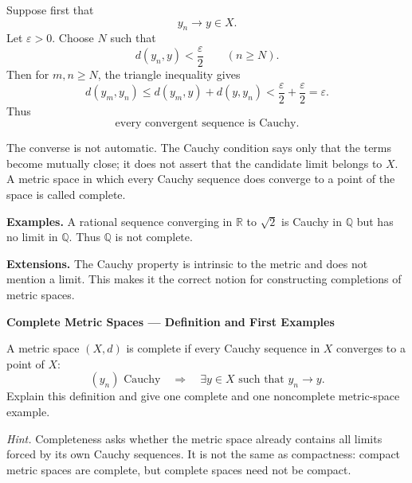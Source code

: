 \begin{solution}
Suppose first that
\[
y_n\to y\in X.
\]
Let \(\varepsilon>0\). Choose \(N\) such that
\[
d(y_n,y)<\frac\varepsilon2
\qquad(n\ge N).
\]
Then for \(m,n\ge N\), the triangle inequality gives
\[
d(y_m,y_n)
\le
d(y_m,y)+d(y,y_n)
<\frac\varepsilon2+\frac\varepsilon2
=\varepsilon.
\]
Thus
\[
\boxed{\text{every convergent sequence is Cauchy}.}
\]

The converse is not automatic. The Cauchy condition says only that the terms
become mutually close; it does not assert that the candidate limit belongs to
\(X\). A metric space in which every Cauchy sequence does converge to a point
of the space is called complete.

\medskip
\noindent\textbf{Examples.}
A rational sequence converging in \(\mathbb R\) to \(\sqrt2\) is Cauchy in
\(\mathbb Q\) but has no limit in \(\mathbb Q\). Thus \(\mathbb Q\) is not
complete.

\medskip
\noindent\textbf{Extensions.}
The Cauchy property is intrinsic to the metric and does not mention a limit.
This makes it the correct notion for constructing completions of metric spaces.
\end{solution}


\begin{problem}[CP-II-0547]
\label{prob:cp-ii-0547}
\textbf{Complete Metric Spaces --- Definition and First Examples}

\hspace*{1.5em}A metric space \((X,d)\) is complete if every Cauchy sequence in \(X\)
converges to a point of \(X\):
\[
(y_n)\text{ Cauchy}
\quad\Longrightarrow\quad
\exists y\in X\text{ such that }y_n\to y.
\]
Explain this definition and give one complete and one noncomplete metric-space
example.

\medskip
\noindent\emph{Hint.} Completeness asks whether the metric space already contains all limits forced
by its own Cauchy sequences. It is not the same as compactness: compact metric
spaces are complete, but complete spaces need not be compact.
\end{problem}

